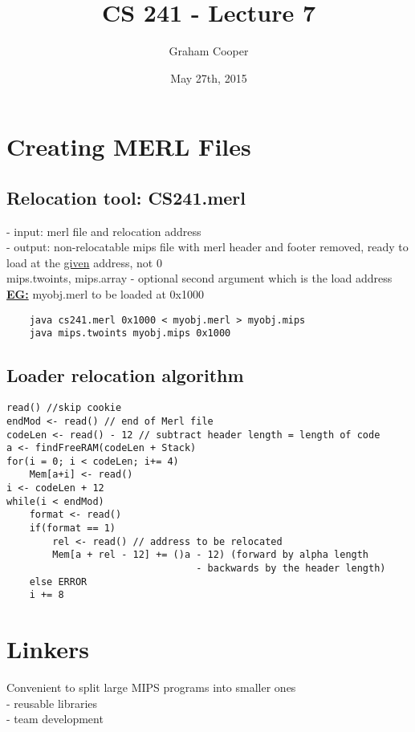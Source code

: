 \documentclass[12pt]{article}
\title{\vspace{-15ex}CS 241 - Lecture 7\vspace{-1ex}}
\date{May 27th, 2015}
\author{Graham Cooper}
\newcommand{\myt}[1]{\textbf{\underline{#1}}}
\begin{document}
	\maketitle
	
	\section*{Creating MERL Files}
	
	\subsection*{Relocation tool: CS241.merl}
	- input: merl file and relocation address\\
	- output: non-relocatable mips file with merl header and footer removed, ready to load at the \underline{given} address, not 0\\
	
	mips.twoints, mips.array - optional second argument which is the load address \\
	
	\myt{EG:} myobj.merl to be loaded at 0x1000\\
	\begin{verbatim}
	java cs241.merl 0x1000 < myobj.merl > myobj.mips
	java mips.twoints myobj.mips 0x1000
	\end{verbatim}
	
	\subsection*{Loader relocation algorithm}
\begin{verbatim}
read() //skip cookie
endMod <- read() // end of Merl file
codeLen <- read() - 12 // subtract header length = length of code
a <- findFreeRAM(codeLen + Stack)
for(i = 0; i < codeLen; i+= 4)
	Mem[a+i] <- read()
i <- codeLen + 12
while(i < endMod)
	format <- read()
	if(format == 1)
		rel <- read() // address to be relocated
		Mem[a + rel - 12] += ()a - 12) (forward by alpha length
								 - backwards by the header length)
	else ERROR
	i += 8
\end{verbatim}
	
	\section*{Linkers}
	Convenient to split large MIPS programs into smaller ones\\
	- reusable libraries\\
	- team development\\
	
\end{document}
